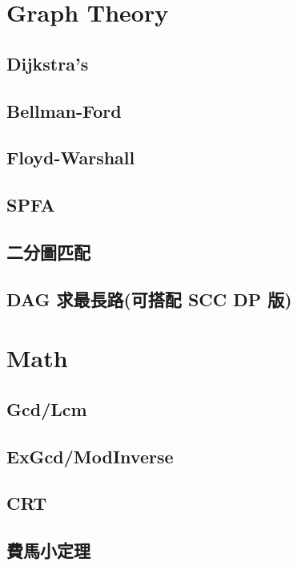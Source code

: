 \section{Graph Theory}
	\subsection{Dijkstra’s}
		
	\subsection{Bellman-Ford}
		
	\subsection{Floyd-Warshall}
		
	\subsection{SPFA}
		
	\subsection{二分圖匹配}
		
	\subsection{DAG 求最長路(可搭配 SCC DP 版)}
		
\section{Math}
	\subsection{Gcd/Lcm}
		
	\subsection{ExGcd/ModInverse}
		
	\subsection{CRT}
		
	\subsection{費馬小定理}
		
